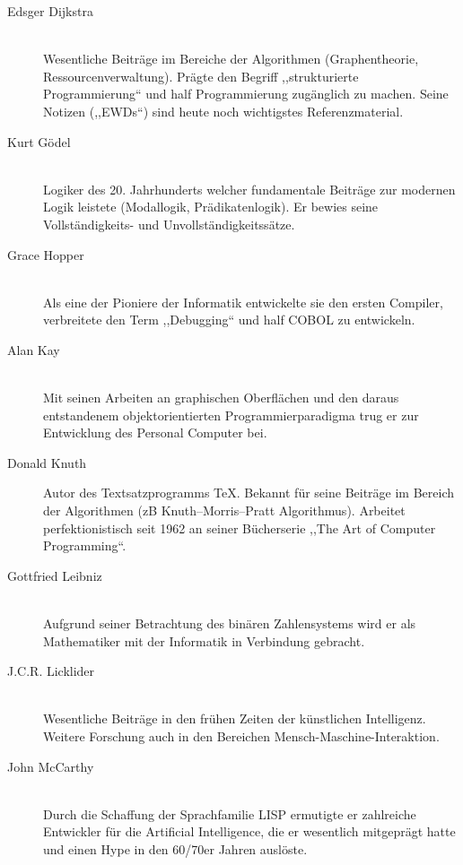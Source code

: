 \begin{description}
  \item[Edsger Dijkstra ] \hfill{} \\
    Wesentliche Beiträge im Bereiche der Algorithmen (Graphentheorie, Ressourcenverwaltung).
    Prägte den Begriff ,,strukturierte Programmierung`` und half Programmierung zugänglich zu machen.
    Seine Notizen (,,EWDs``) sind heute noch wichtigstes Referenzmaterial.

  \item[Kurt Gödel ] \hfill{} \\
    Logiker des 20. Jahrhunderts welcher fundamentale Beiträge zur modernen Logik leistete
    (Modallogik, Prädikatenlogik). Er bewies seine Vollständigkeits- und Unvollständigkeitssätze.

  \item[Grace Hopper ] \hfill{} \\
    Als eine der Pioniere der Informatik entwickelte sie den ersten Compiler, verbreitete den Term ,,Debugging`` und half COBOL zu entwickeln.

  \item[Alan Kay ] \hfill{} \\
    Mit seinen Arbeiten an graphischen Oberflächen und den daraus entstandenem objektorientierten Programmierparadigma trug er zur Entwicklung des Personal Computer bei.

  \item[Donald Knuth ] \hfill{}
    Autor des Textsatzprogramms \TeX. Bekannt für seine Beiträge im Bereich der Algorithmen (zB Knuth–Morris–Pratt Algorithmus). Arbeitet perfektionistisch seit 1962 an seiner Bücherserie ,,The Art of Computer Programming``.

  \item[Gottfried Leibniz ] \hfill{} \\
    Aufgrund seiner Betrachtung des binären Zahlensystems wird er als Mathematiker mit der Informatik in Verbindung gebracht.

  \item[J.C.R. Licklider ] \hfill{} \\
    Wesentliche Beiträge in den frühen Zeiten der künstlichen Intelligenz.
    Weitere Forschung auch in den Bereichen Mensch-Maschine-Interaktion.

  \item[John McCarthy ] \hfill{} \\
    Durch die Schaffung der Sprachfamilie LISP ermutigte er zahlreiche Entwickler für die Artificial Intelligence, die er wesentlich mitgeprägt hatte und einen Hype in den 60/70er Jahren auslöste.


\end{description}
